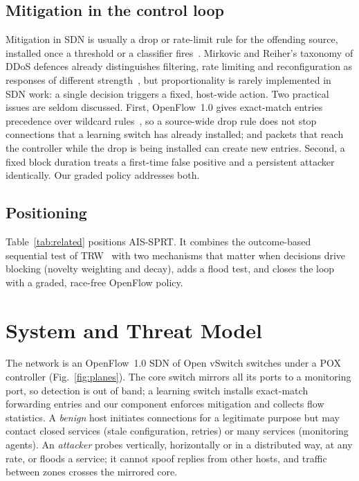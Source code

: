 \documentclass[conference]{IEEEtran}
\begin{document}
\subsection{Mitigation in the control loop}
Mitigation in SDN is usually a drop or rate-limit rule for the offending source, installed once a threshold or a
classifier fires~\cite{giotis2014combining,belachew2025robust}. Mirkovic and Reiher's taxonomy of DDoS defences already
distinguishes filtering, rate limiting and reconfiguration as responses of different strength~\cite{mirkovic2004taxonomy},
but proportionality is rarely implemented in SDN work: a single decision triggers a fixed, host-wide action. Two practical
issues are seldom discussed. First, OpenFlow~1.0 gives exact-match entries precedence over wildcard
rules~\cite{onf2009of10}, so a source-wide drop rule does not stop connections that a learning switch has already
installed; and packets that reach the controller while the drop is being installed can create new entries. Second, a
fixed block duration treats a first-time false positive and a persistent attacker identically. Our graded policy
addresses both.

\subsection{Positioning}
Table~\ref{tab:related} positions AIS-SPRT. It combines the outcome-based sequential test of
TRW~\cite{jung2004trw} with two mechanisms that matter when decisions drive blocking (novelty weighting and decay),
adds a flood test, and closes the loop with a graded, race-free OpenFlow policy.


\section{System and Threat Model}\label{sec:system}
The network is an OpenFlow~1.0 SDN of Open vSwitch switches under a POX controller (Fig.~\ref{fig:planes}). The core switch
mirrors all its ports to a monitoring port, so detection is out of band; a learning switch installs exact-match forwarding
entries and our component enforces mitigation and collects flow statistics. A \emph{benign} host initiates connections for a
legitimate purpose but may contact closed services (stale configuration, retries) or many services (monitoring agents). An
\emph{attacker} probes vertically, horizontally or in a distributed way, at any rate, or floods a service; it cannot spoof
replies from other hosts, and traffic between zones crosses the mirrored core.
\end{document}
